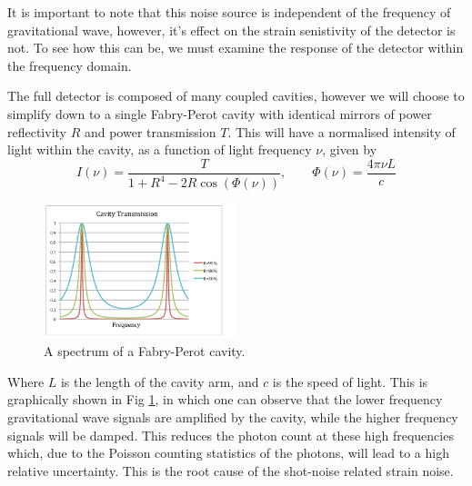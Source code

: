\documentclass[aps,  
                a4paper, 
                amsmath, 
                amssymb, 
                preprint,
                tightenlines,  
                amsfonts,
                nofootinbib,
                onecolumn,
                titlepage,
                10pt
            ]{revtex4-2}
\begin{document}
    It is important to note that this noise source is independent of the frequency of gravitational wave, however, it's effect on the strain senistivity of the detector is not. To see how this can be, we must examine the response of the detector within the frequency domain.
    \par
    The full detector is composed of many coupled cavities, however we will choose to simplify down to a single Fabry-Perot cavity with identical mirrors of power reflectivity $R$ and power transmission $T$. This will have a normalised intensity of light within the cavity, as a function of light frequency $\nu$, given by
    \begin{equation}
        \label{eq:fabry-perot-intracavity-intensity}
        I(\nu)=\frac{T}{1+R^4-2R\cos{(\Phi(\nu))}}, \qquad \Phi(\nu)=\frac{4\pi\nu L}{c}
    \end{equation}
    \begin{figure}
        \centering
        \includegraphics[width=0.5\textwidth]{img/fabry-perot.png}
        \caption{A spectrum of a Fabry-Perot cavity\cite{wharton2011}.}
        \label{fig:fabry-perot-spectrum}
    \end{figure}    
    Where $L$ is the length of the cavity arm, and $c$ is the speed of light. This is graphically shown in Fig \ref{fig:fabry-perot-spectrum}, in which one can observe that the lower frequency gravitational wave signals are amplified by the cavity, while the higher frequency signals will be damped. This reduces the photon count at these high frequencies which, due to the Poisson counting statistics of the photons, will lead to a high relative uncertainty. This is the root cause of the shot-noise related strain noise.
\end{document}
